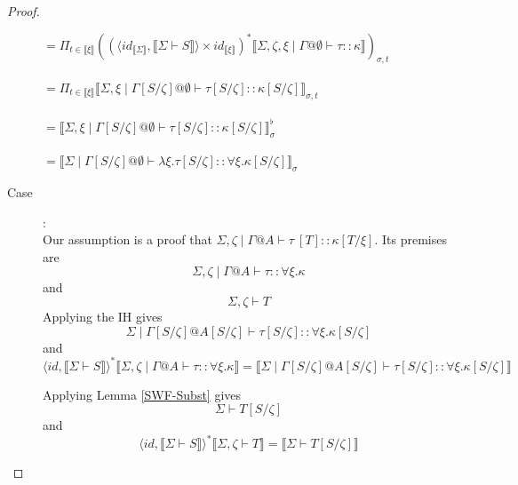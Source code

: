 \documentclass{article}
\newcommand{\sem}[1]{\llbracket #1 \rrbracket}
\begin{document}
\begin{proof}
\begin{description}
$= \Pi_{t \in \sem{\xi}}((\langle \mathit{id}_{\sem{\Sigma}}, \sem{\Sigma \vdash S} \rangle \times \mathit{id}_{\sem{\xi}})^* \sem{\Sigma,\zeta,\xi \mid \Gamma @ \emptyset \vdash \tau :: \kappa})_{\sigma,t}$\\~\\
$= \Pi_{t \in \sem{\xi}} \sem{\Sigma, \xi \mid \Gamma[S/\zeta] @ \emptyset \vdash \tau[S/\zeta] :: \kappa[S/\zeta]}_{\sigma, t}$\\~\\
$= \sem{\Sigma,\xi \mid \Gamma[S/\zeta] @ \emptyset \vdash \tau[S/\zeta] :: \kappa[S/\zeta]}^{\flat}_\sigma$\\~\\
$= \sem{\Sigma \mid \Gamma[S/\zeta] @ \emptyset \vdash \lambda \xi. \tau[S/\zeta] :: \forall \xi. \kappa[S/\zeta]}_\sigma$

\item[Case \sc{StrApp}]:~\\
Our assumption is a proof that $\Sigma,\zeta \mid \Gamma @ A \vdash \tau~[T] :: \kappa[T/\xi]$. Its premises are 
$$\Sigma,\zeta \mid \Gamma @ A \vdash \tau :: \forall \xi. \kappa$$ 
and
$$\Sigma,\zeta \vdash T$$
Applying the IH gives 
$$\Sigma \mid \Gamma[S/\zeta] @ A[S/\zeta] \vdash \tau[S/\zeta] :: \forall \xi. \kappa[S/\zeta]$$
and
$$\langle \mathit{id}, \sem{\Sigma \vdash S} \rangle^* \sem{\Sigma,\zeta \mid \Gamma @ A \vdash \tau :: \forall \xi. \kappa} = \sem{\Sigma \mid \Gamma[S/\zeta] @ A[S/\zeta] \vdash \tau[S/\zeta] :: \forall \xi. \kappa[S/\zeta]}$$

Applying Lemma \ref{SWF-Subst} gives 
$$\Sigma \vdash T[S/\zeta]$$
and
$$\langle \mathit{id}, \sem{\Sigma \vdash S} \rangle^* \sem{\Sigma,\zeta \vdash T} = \sem{\Sigma \vdash T[S/\zeta]}$$


\end{description}
\end{proof}
\end{document}
